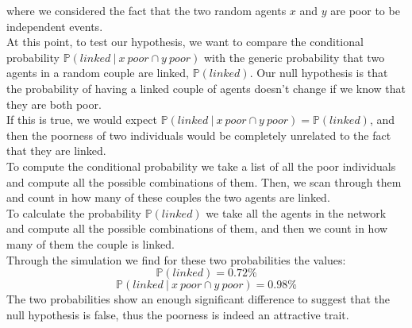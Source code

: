 where we considered the fact that the two random agents $x$ and $y$ are poor to be independent events. \\
At this point, to test our hypothesis, we want to compare the conditional probability $\mathbb{P}(linked \ \vert \ x \ poor \cap y \ poor)$ with the generic probability that two agents in a random couple are linked, $\mathbb{P}(linked)$.
Our null hypothesis is that the probability of having a linked couple of agents doesn't change if we know that they are both poor. \\
If this is true, we would expect $\mathbb{P}(linked \ \vert \ x \ poor \cap y \ poor) = \mathbb{P}(linked)$, and then the poorness of two individuals would be completely unrelated to the fact that they are linked. \\
To compute the conditional probability we take a list of all the poor individuals and compute all the possible combinations of them.
Then, we scan through them and count in how many of these couples the two agents are linked. \\
To calculate the probability $\mathbb{P}(linked)$ we take all the agents in the network and compute all the possible combinations of them, and then we count in how many of them the couple is linked. \\
Through the simulation we find for these two probabilities the values:
\begin{equation*}
	\mathbb{P}(linked) = 0.72\%
\end{equation*}
\begin{equation*}
	\mathbb{P}(linked \ \vert \ x \ poor \cap y \ poor) = 0.98\%
\end{equation*}
The two probabilities show an enough significant difference to suggest that the null hypothesis is false, thus the poorness is indeed an attractive trait.
